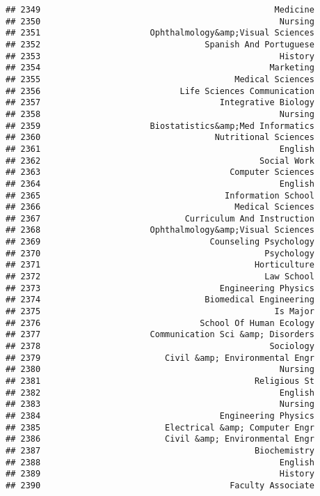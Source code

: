 \documentclass[
]{article}
\begin{document}
\begin{verbatim}
## 2349                                               Medicine
## 2350                                                Nursing
## 2351                      Ophthalmology&amp;Visual Sciences
## 2352                                 Spanish And Portuguese
## 2353                                                History
## 2354                                              Marketing
## 2355                                       Medical Sciences
## 2356                            Life Sciences Communication
## 2357                                    Integrative Biology
## 2358                                                Nursing
## 2359                      Biostatistics&amp;Med Informatics
## 2360                                   Nutritional Sciences
## 2361                                                English
## 2362                                            Social Work
## 2363                                      Computer Sciences
## 2364                                                English
## 2365                                     Information School
## 2366                                       Medical Sciences
## 2367                             Curriculum And Instruction
## 2368                      Ophthalmology&amp;Visual Sciences
## 2369                                  Counseling Psychology
## 2370                                             Psychology
## 2371                                           Horticulture
## 2372                                             Law School
## 2373                                    Engineering Physics
## 2374                                 Biomedical Engineering
## 2375                                               Is Major
## 2376                                School Of Human Ecology
## 2377                      Communication Sci &amp; Disorders
## 2378                                              Sociology
## 2379                         Civil &amp; Environmental Engr
## 2380                                                Nursing
## 2381                                           Religious St
## 2382                                                English
## 2383                                                Nursing
## 2384                                    Engineering Physics
## 2385                         Electrical &amp; Computer Engr
## 2386                         Civil &amp; Environmental Engr
## 2387                                           Biochemistry
## 2388                                                English
## 2389                                                History
## 2390                                      Faculty Associate

\end{verbatim}
\end{document}
